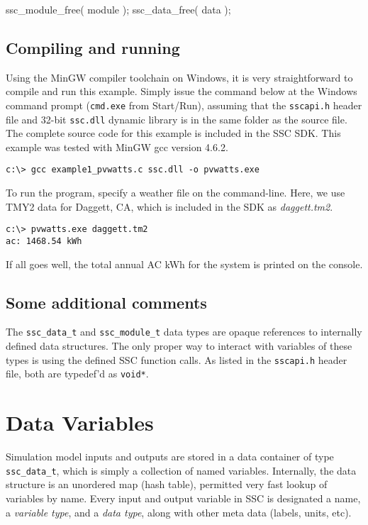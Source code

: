 \documentclass{article}
\begin{document}
\begin{verbatimtab}	
	ssc_module_free( module );
	ssc_data_free( data );
\end{verbatimtab}

\subsection{Compiling and running}

Using the MinGW compiler toolchain on Windows, it is very straightforward to compile and run this example.  Simply issue the command below at the Windows command prompt (\texttt{cmd.exe} from Start/Run), assuming that the \texttt{sscapi.h} header file and 32-bit \texttt{ssc.dll} dynamic library is in the same folder as the source file.  The complete source code for this example is included in the SSC SDK.  This example was tested with MinGW gcc version 4.6.2.

\begin{verbatim}
c:\> gcc example1_pvwatts.c ssc.dll -o pvwatts.exe
\end{verbatim}

To run the program, specify a weather file on the command-line.  Here, we use TMY2 data for Daggett, CA, which is included in the SDK as \emph{daggett.tm2}.

\begin{verbatim}
c:\> pvwatts.exe daggett.tm2
ac: 1468.54 kWh
\end{verbatim}

If all goes well, the total annual AC kWh for the system is printed on the console.


\subsection{Some additional comments}

The \texttt{ssc\_data\_t} and \texttt{ssc\_module\_t} data types are opaque references to internally defined data structures.  The only proper way to interact with variables of these types is using the defined SSC function calls.  As listed in the \texttt{sscapi.h} header file, both are typedef'd as \texttt{void*}.


\section{Data Variables}
\label{sec_variables}

Simulation model inputs and outputs are stored in a data container of type \texttt{ssc\_data\_t}, which is simply a collection of named variables.  Internally, the data structure is an unordered map (hash table), permitted very fast lookup of variables by name.  Every input and output variable in SSC is designated a name, a \emph{variable type}, and a \emph{data type}, along with other meta data (labels, units, etc). 
\end{document}
